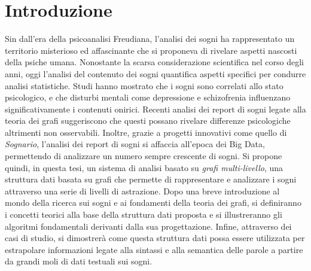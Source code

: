 \chapter*{Introduzione}

Sin dall'era della psicoanalisi Freudiana, l'analisi dei sogni ha rappresentato un territorio misterioso
ed affascinante che si proponeva di rivelare aspetti nascosti della psiche umana.
Nonostante la scarsa considerazione scientifica nel corso degli anni, oggi l'analisi del contenuto dei sogni
quantifica aspetti specifici per condurre analisi statistiche.
Studi hanno mostrato che i sogni sono correlati allo stato psicologico, e che disturbi mentali come depressione e
schizofrenia influenzano significativamente i contenuti onirici.
Recenti analisi dei report di sogni legate alla teoria dei grafi suggeriscono che questi possano rivelare differenze
psicologiche altrimenti non osservabili.
Inoltre, grazie a progetti innovativi come quello di \textit{Sognario}, l'analisi dei report di sogni si affaccia
all'epoca dei Big Data, permettendo di analizzare un numero sempre crescente di sogni.
Si propone quindi, in questa tesi, un sistema di analisi basato su \textit{grafi multi-livello},
una struttura dati basata su grafi che permette di rappresentare e analizzare i sogni attraverso una serie di livelli
di astrazione.
Dopo una breve introduzione al mondo della ricerca sui sogni e ai fondamenti della teoria dei grafi,
si definiranno i concetti teorici alla base della struttura dati proposta e si illustreranno gli algoritmi
fondamentali derivanti dalla sua progettazione.
Infine, attraverso dei casi di studio, si dimostrerà come questa struttura dati possa essere utilizzata per
estrapolare informazioni legate alla sintassi e alla semantica delle parole a partire da
grandi moli di dati testuali sui sogni.